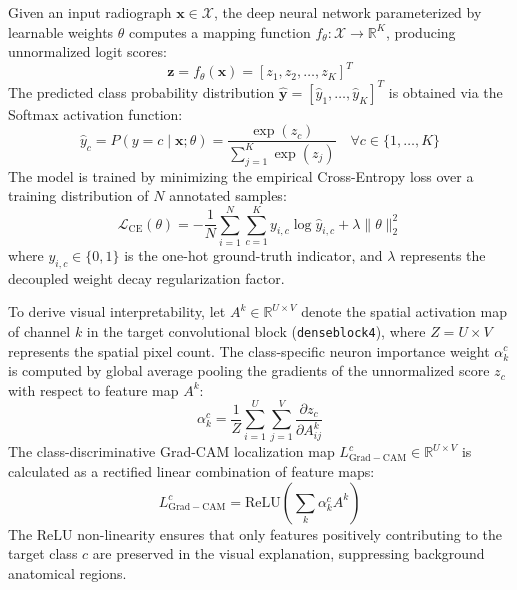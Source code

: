 \documentclass[12pt,a4paper]{report}
\begin{document}
Given an input radiograph $\mathbf{x} \in \mathcal{X}$, the deep neural network parameterized by learnable weights $\theta$ computes a mapping function $f_\theta: \mathcal{X} \to \mathbb{R}^K$, producing unnormalized logit scores:
\begin{equation}
    \mathbf{z} = f_\theta(\mathbf{x}) = [z_1, z_2, \dots, z_K]^T
\end{equation}
The predicted class probability distribution $\hat{\mathbf{y}} = [\hat{y}_1, \dots, \hat{y}_K]^T$ is obtained via the Softmax activation function:
\begin{equation}
    \hat{y}_c = P(y = c \mid \mathbf{x}; \theta) = \frac{\exp(z_c)}{\sum_{j=1}^K \exp(z_j)} \quad \forall c \in \{1, \dots, K\}
\end{equation}
The model is trained by minimizing the empirical Cross-Entropy loss over a training distribution of $N$ annotated samples:
\begin{equation}
    \mathcal{L}_{\mathrm{CE}}(\theta) = -\frac{1}{N} \sum_{i=1}^N \sum_{c=1}^K y_{i,c} \log \hat{y}_{i,c} + \lambda \|\theta\|_2^2
\end{equation}
where $y_{i,c} \in \{0, 1\}$ is the one-hot ground-truth indicator, and $\lambda$ represents the decoupled weight decay regularization factor.

To derive visual interpretability, let $A^k \in \mathbb{R}^{U \times V}$ denote the spatial activation map of channel $k$ in the target convolutional block (\texttt{denseblock4}), where $Z = U \times V$ represents the spatial pixel count. The class-specific neuron importance weight $\alpha_k^c$ is computed by global average pooling the gradients of the unnormalized score $z_c$ with respect to feature map $A^k$:
\begin{equation}
    \alpha_k^c = \frac{1}{Z} \sum_{i=1}^U \sum_{j=1}^V \frac{\partial z_c}{\partial A_{ij}^k}
\end{equation}
The class-discriminative Grad-CAM localization map $L_{\mathrm{Grad-CAM}}^c \in \mathbb{R}^{U \times V}$ is calculated as a rectified linear combination of feature maps:
\begin{equation}
    L_{\mathrm{Grad-CAM}}^c = \mathrm{ReLU}\left( \sum_k \alpha_k^c A^k \right)
\end{equation}
The $\mathrm{ReLU}$ non-linearity ensures that only features positively contributing to the target class $c$ are preserved in the visual explanation, suppressing background anatomical regions.


\end{document}
